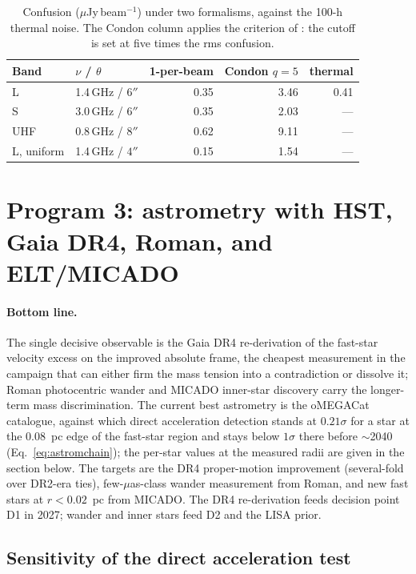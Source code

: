 \documentclass[11pt]{article}
\begin{document}
\begin{table}[htbp]
\centering
\small
\caption{Confusion ($\mu$Jy\,beam$^{-1}$) under two formalisms, against
the 100-h thermal noise. The Condon column applies the criterion of
\citet{Condon2007}: the cutoff is set at five times the rms confusion.}
\label{tab:confusion}
\begin{tabular}{llrrr}
\toprule
Band & $\nu$ / $\theta$ & 1-per-beam & Condon $q=5$ & thermal \\
\midrule
L    & 1.4\,GHz / $6''$  & 0.35 & 3.46 & 0.41 \\
S    & 3.0\,GHz / $6''$  & 0.35 & 2.03 & --- \\
UHF  & 0.8\,GHz / $8''$  & 0.62 & 9.11 & --- \\
L, uniform & 1.4\,GHz / $4''$ & 0.15 & 1.54 & --- \\
\bottomrule
\end{tabular}
\end{table}

\section{Program 3: astrometry with HST, Gaia DR4, Roman, and ELT/MICADO}
\label{sec:astrometry}

\paragraph{Bottom line.} The single decisive observable is the Gaia DR4 re-derivation of the fast-star velocity excess on the improved absolute frame, the cheapest measurement in the campaign that can either firm the mass tension into a contradiction or dissolve it; Roman photocentric wander and MICADO inner-star discovery carry the longer-term mass discrimination. The current best astrometry is the oMEGACat catalogue, against which direct acceleration detection stands at $0.21\sigma$ for a star at the $0.08$~pc edge of the fast-star region and stays below $1\sigma$ there before $\sim$2040 (Eq.~\ref{eq:astromchain}); the per-star values at the measured radii are given in the section below. The targets are the DR4 proper-motion improvement (several-fold over DR2-era ties), few-$\mu$as-class wander measurement from Roman, and new fast stars at $r < 0.02$~pc from MICADO. The DR4 re-derivation feeds decision point D1 in 2027; wander and inner stars feed D2 and the LISA prior.

\subsection{Sensitivity of the direct acceleration test}
\label{sec:honest}
\end{document}
